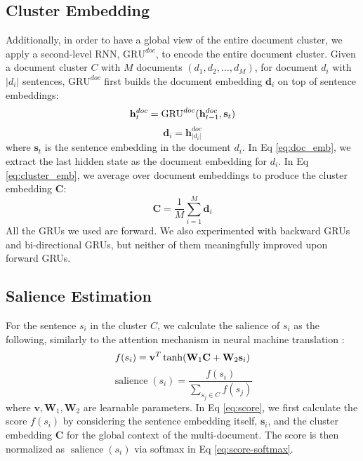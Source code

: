 \documentclass[11pt,a4paper]{article}
\renewcommand{\vec}[1]{\mathbf{#1}}
\DeclareMathOperator{\sal}{salience}
\begin{document}
\subsection{Cluster Embedding}
Additionally, in order to have a global view of the entire document cluster, we apply a second-level RNN, $\mathrm{GRU}^{doc}$, to encode the entire document cluster.
Given a document cluster $C$ with $M$ documents $(d_1, d_2,..., d_M)$, for document $d_i$ with $|d_i|$ sentences, $\mathrm{GRU}^{doc}$ first builds the document embedding $\vec{d}_i$ on top of sentence embeddings:
\begin{equation}
  \vec{h}_{t}^{doc} = \mathrm{GRU}^{doc}(\vec{h}_{t-1}^{doc},\vec{s}_{t})
\vspace{-5mm}
\end{equation}
\begin{equation}
\label{eq:doc_emb}
  \vec{d}_i = \vec{h}_{|d_i|}^{doc}
\end{equation}
where $\vec{s}_t$ is the sentence embedding in the document $d_i$.
In Eq \ref{eq:doc_emb}, we extract the last hidden state as the document embedding for $d_i$.
In Eq \ref{eq:cluster_emb}, we average over document embeddings to produce the cluster embedding $\vec{C}$:
\begin{equation}
\label{eq:cluster_emb}
  \vec{C} = \frac{1}{M}\sum_{i=1}^{M}\vec{d}_i
\end{equation}
All the GRUs we used are forward.
We also experimented with backward GRUs and bi-directional GRUs, but neither of them meaningfully improved upon forward GRUs. 

\subsection{Salience Estimation}
For the sentence $s_i$ in the cluster $C$, we calculate the salience of $s_i$ as the following, similarly to the attention mechanism in neural machine translation \cite{bahdanau2014neural}:
\begin{equation}
\label{eq:score}
  f(s_i) = \vec{v}^T\tanh(\vec{W}_1 \vec{C} + \vec{W}_2 \vec{s}_i)
\vspace{-5mm}
\end{equation}
\begin{equation}
\label{eq:score-softmax}
  \sal(s_i) = \frac{f(s_i)}{\sum_{s_j \in C}f(s_j)}
\end{equation}
where $\vec{v},\vec{W}_1,\vec{W}_2$ are learnable parameters.
In Eq \ref{eq:score}, we first calculate the score $f(s_i)$ by considering the sentence embedding itself, $\vec{s}_i$, and the cluster embedding $\vec{C}$ for the global context of the multi-document.
The score is then normalized as $\sal(s_i)$ via softmax in Eq \ref{eq:score-softmax}.
\end{document}
